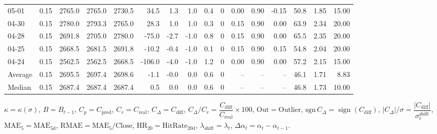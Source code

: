 \begin{threeparttable}
{\begin{tabular}{lrrrrrrrrrrrrrrr}
  05-01 &     0.15 & 2765.0 & 2765.0 & 2730.5 &       34.5 &            1.3 &                      1.0 &                 0.4 &              0 &       0.00 &      0.90 &          -0.15 &             50.8 &            1.85 &                  15.00 \\
  04-30 &     0.15 & 2780.0 & 2793.3 & 2765.0 &       28.3 &            1.0 &                      1.0 &                 0.3 &              0 &       0.15 &      0.90 &           0.00 &             63.9 &            2.34 &                  20.00 \\
  04-28 &     0.15 & 2691.8 & 2705.0 & 2780.0 &      -75.0 &           -2.7 &                     -1.0 &                 0.8 &              0 &       0.15 &      0.90 &           0.00 &             65.5 &            2.35 &                  20.00 \\
  04-25 &     0.15 & 2668.5 & 2681.5 & 2691.8 &      -10.2 &           -0.4 &                     -1.0 &                 0.1 &              0 &       0.15 &      0.90 &           0.15 &             54.8 &            2.04 &                  20.00 \\
  04-24 &     0.15 & 2562.5 & 2562.5 & 2668.5 &     -106.0 &           -4.0 &                     -1.0 &                 1.2 &              0 &       0.00 &      0.90 &           0.00 &             57.2 &            2.15 &                  15.00 \\
Average &     0.15 & 2695.5 & 2697.4 & 2698.6 &       -1.1 &           -0.0 &                      0.0 &                 0.6 &              0 &         -- &        -- &             -- &             46.1 &            1.71 &                   8.83 \\
 Median &     0.15 & 2687.4 & 2687.4 & 2687.4 &        0.5 &            0.0 &                      0.0 &                 0.6 &              0 &         -- &        -- &             -- &             46.8 &            1.73 &                  10.00 \\
\bottomrule
\end{tabular}
}
\begin{tablenotes}\footnotesize
\item $\kappa=\kappa(\sigma)$, $B=B_{t-1}$, $C_p=C_{\text{pred}}$, $C_r=C_{\text{real}}$, $C_\Delta=C_{\text{diff}}$, $C_\Delta/C_r=\dfrac{C_{\text{diff}}}{C_{\text{real}}}\times100$, $\mathrm{Out}=\text{Outlier}$, $\mathrm{sgn}\,C_\Delta=\operatorname{sign}(C_{\text{diff}})$, $|C_\Delta|/\sigma=\dfrac{|C_{\text{diff}}|}{\sigma_t^{\text{shift}}}$, $\mathrm{MAE}_5=\mathrm{MAE}_{5\text{d}}$, $\mathrm{RMAE}= \mathrm{MAE}_5 / \text{Close}$, $\mathrm{HR}_{20}=\mathrm{HitRate}_{20\text{d}}$, 
$\lambda_{\text{shift}}=\lambda_t$, 
$\Delta\alpha_t=\alpha_t-\alpha_{t-1}$.
\end{tablenotes}
\end{threeparttable}
\endgroup

